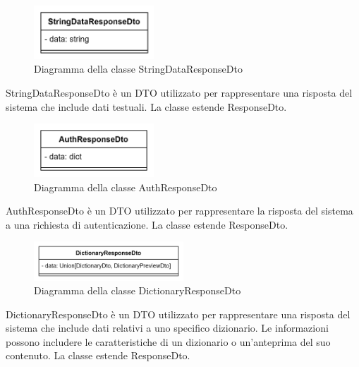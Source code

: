  \label{StringDataResponseDto}
\begin{figure}[H]
    \centering
    \includegraphics[width=0.4\textwidth]{assets/Backend/string_data_response_dto.png}
    \caption{Diagramma della classe StringDataResponseDto}
  \end{figure}
\par StringDataResponseDto è un DTO utilizzato per rappresentare una risposta del sistema che include dati testuali. La classe estende ResponseDto.

 \label{AuthResponseDto}
\begin{figure}[H]
    \centering
    \includegraphics[width=0.4\textwidth]{assets/Backend/auth_response_dto.png}
    \caption{Diagramma della classe AuthResponseDto}
  \end{figure}
\par AuthResponseDto è un DTO utilizzato per rappresentare la risposta del sistema a una richiesta di autenticazione. La classe estende ResponseDto.

 \label{DictionaryResponseDto}
\begin{figure}[H]
    \centering
    \includegraphics[width=0.5\textwidth]{assets/Backend/dictionary_response_dto.png}
    \caption{Diagramma della classe DictionaryResponseDto}
  \end{figure}
\par DictionaryResponseDto è un DTO utilizzato per rappresentare una risposta del sistema che include dati relativi a uno specifico dizionario. Le informazioni possono includere le caratteristiche di un dizionario o un'anteprima del suo contenuto. La classe estende ResponseDto.

